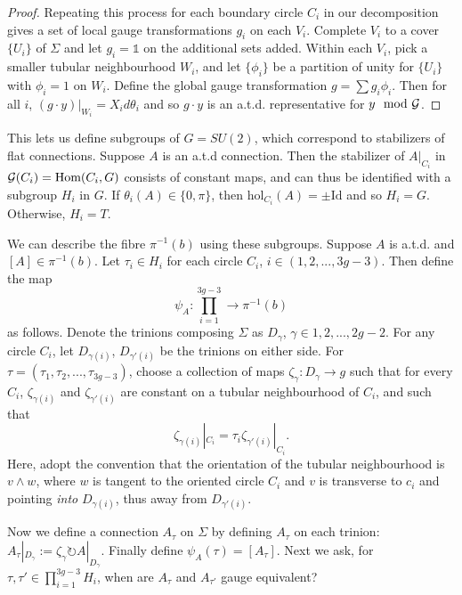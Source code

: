 \begin{proof}
	Repeating this process for each boundary circle $C_i$ in our decomposition gives a set of local gauge transformations $g_i$ on each $V_i$. Complete $V_i$ to a cover $\{U_i\}$ of $\Sigma$ and let $g_i = \mathds{1}$ on the additional sets added. Within each $V_i$, pick a smaller tubular neighbourhood $W_i$, and let $\{\phi_i\}$ be a partition of unity for $\{U_i\}$ with $\phi_i = 1$ on $W_i$. Define the global gauge transformation $g = \sum g_i \phi_i$. Then for all $i$, $(g\cdot y)|_{W_i} = X_i d\theta_i$ and so $g\cdot y$ is an a.t.d. representative for $y \mod {\mathcal{G}}$.
	\end{proof}
	
	This lets us define subgroups of $G=SU(2)$, which correspond to stabilizers of flat connections. Suppose $A$ is an a.t.d connection. Then the stabilizer of $A|_{C_i}$ in $\mathcal{G}(C_i) = \text{Hom}(C_i, G)$ consists of constant maps, and can thus be identified with a subgroup $H_i$ in $G$. If $\theta_i(A) \in \{0,\pi\}$, then $\text{hol}_{C_i}(A) = \pm\text{Id}$ and so $H_i = G$. Otherwise, $H_i = T$. 
	
	We can describe the fibre $\pi^{-1}(b)$ using these subgroups. Suppose $A$ is a.t.d. and $[A] \in \pi^{-1}(b)$. Let $\tau_i \in H_i$ for each circle $C_i$, $i\in (1,2,...,3g-3)$. Then define the map
	\begin{equation}
		\label{e:psiA}
		\psi_A : \prod_{i=1}^{3g-3} \to \pi^{-1}(b)
	\end{equation}
	as follows. Denote the trinions composing $\Sigma$ as $D_{\gamma}$, $\gamma\in{1,2,...,2g-2}$. For any circle $C_i$, let $D_{\gamma(i)}$, $D_{\gamma'(i)}$ be the trinions on either side. For $\tau=(\tau_1,\tau_2,...,\tau_{3g-3})$, choose a collection of maps $\zeta_\gamma : D_\gamma \to g$ such that for every $C_i$, $\zeta_{\gamma(i)}$ and $\zeta_{\gamma'(i)}$ are constant on a tubular neighbourhood of $C_i$, and such that
	\begin{equation}
		\zeta_{\gamma(i)}|_{C_i} = \tau_i \zeta_{\gamma'(i)}|_{C_i}.
	\end{equation}
	Here, adopt the convention that the orientation of the tubular neighbourhood is $v\wedge w$, where $w$ is tangent to the oriented circle $C_i$ and $v$ is transverse to $c_i$ and pointing \textit{into} $D_{\gamma(i)}$, thus away from $D_{\gamma'(i)}$.
	
	Now we define a connection $A_\tau$ on $\Sigma$ by defining $A_\tau$ on each trinion: $A_\tau|_{D_\gamma} := \zeta_\gamma \circlearrowright A|_{D_\gamma}$. Finally define $\psi_A(\tau) = [A_\tau]$. Next we ask, for $\tau,\tau' \in \prod_{i=1}^{3g-3} H_i$, when are $A_\tau$ and $A_{\tau'}$ gauge equivalent? 
	

